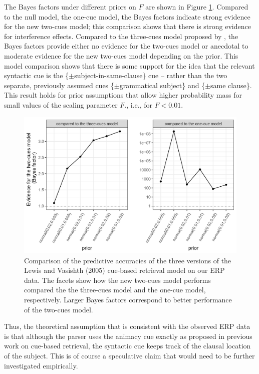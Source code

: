 \documentclass[review,preprint,12pt,authoryear,floatsintext]{elsarticle}
\begin{document}
{{The Bayes factors under different priors on $F$ are shown in Figure \ref{fig:BF_compmods}. Compared to the null model, the one-cue model, the Bayes factors indicate strong evidence for the new two-cues model; this comparison shows that there is strong evidence for interference effects. Compared to the three-cues model proposed by \cite{mertzen}, the Bayes factors provide either no evidence for the two-cues model or anecdotal to moderate evidence for the new two-cues model depending on the prior. This model comparison shows that there is some support for the idea that the relevant syntactic cue is the \{$\pm$subject-in-same-clause\} cue – rather than the two separate, previously assumed cues \{$\pm$grammatical subject\} and \{$\pm$same clause\}. This result holds for prior assumptions that allow higher probability mass for small values of the scaling parameter $F$., i.e., for $F<0.01$.

\begin{figure}[ht]
    \centering
    \caption{Comparison of the predictive accuracies of the three versions of the Lewis and Vasishth (2005) cue-based retrieval model on our ERP data. The facets show how the new two-cues model performs compared the the three-cues model and the one-cue model, respectively. Larger Bayes factors correspond to better performance of the two-cues model.}
    \label{fig:BF_compmods}
    \includegraphics[width=\linewidth]{BF_plot_compmodels.png}
\end{figure}

Thus, the theoretical assumption that is consistent with the observed ERP data is that although the parser uses the animacy cue exactly as proposed in previous work on cue-based retrieval, the syntactic cue keeps track of the clausal location of the subject. This is of course a speculative claim that would need to be further investigated empirically. 

}}
\end{document}
